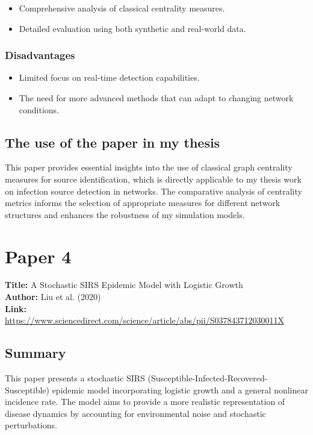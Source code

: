 \begin{itemize}
    \item Comprehensive analysis of classical centrality measures.
    \item Detailed evaluation using both synthetic and real-world data.
\end{itemize}

\subsubsection{Disadvantages}

\begin{itemize}
    \item Limited focus on real-time detection capabilities.
    \item The need for more advanced methods that can adapt to changing network conditions.
\end{itemize}

\subsection{The use of the paper in my thesis}

This paper provides essential insights into the use of classical graph centrality measures for source identification, which is directly applicable to my thesis work on infection source detection in networks. The comparative analysis of centrality metrics informs the selection of appropriate measures for different network structures and enhances the robustness of my simulation models.

\section{Paper 4}
\textbf{Title:} A Stochastic SIRS Epidemic Model with Logistic Growth \\
\textbf{Author:} Liu et al. (2020) \\
\textbf{Link:} \url{https://www.sciencedirect.com/science/article/abs/pii/S037843712030011X}

\subsection{Summary}

This paper presents a stochastic SIRS (Susceptible-Infected-Recovered-Susceptible) epidemic model incorporating logistic growth and a general nonlinear incidence rate. The model aims to provide a more realistic representation of disease dynamics by accounting for environmental noise and stochastic perturbations.

